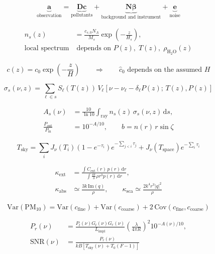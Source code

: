 \documentclass{article}
\begin{document}
\color{eqcolor}\fontsize{24}{32}\selectfont
\[\displaystyle \underbrace{\mathbf a}_{\text{observation}}=\underbrace{\mathbf D\mathbf c}_{\text{pollutants}}+\underbrace{\mathbf N\boldsymbol\beta}_{\text{background and instrument}}+\underbrace{\mathbf e}_{\text{noise}}\]

\newpage
\[\displaystyle \begin{aligned}n_s(z)&=\frac{c_{s,0}N_A}{M_s}\exp\!\left(-\frac{z}{H_s}\right),\\[4pt] \text{local spectrum}&\;\text{depends on }P(z),\;T(z),\;\rho_{\mathrm{H_2O}}(z)\end{aligned}\]

\newpage
\[\displaystyle c(z)=c_0\exp\!\left(-\frac{z}{H}\right)\qquad\Longrightarrow\qquad\widehat c_0\text{ depends on the assumed }H\]

\newpage
\[\displaystyle \sigma_s(\nu,z)=\sum_{\ell\in s}S_\ell\!\left(T(z)\right)\,V_\ell\!\left[\nu-\nu_\ell-\delta_\ell P(z);\,T(z),P(z)\right]\]

\newpage
\[\displaystyle \begin{aligned}A_s(\nu)&=\frac{10}{\ln 10}\int_{\mathrm{ray}}n_s(z)\,\sigma_s(\nu,z)\,\mathrm ds,\\[4pt]\frac{P_{\mathrm{out}}}{P_{\mathrm{in}}}&=10^{-A/10},\qquad b=n(r)\,r\sin\zeta\end{aligned}\]

\newpage
\[\displaystyle T_{\mathrm{sky}}=\sum_i J_\nu(T_i)\left(1-e^{-\tau_i}\right)e^{-\sum_{j<i}\tau_j}+J_\nu(T_{\mathrm{space}})e^{-\sum_i\tau_i}\]

\newpage
\[\displaystyle \begin{aligned}\kappa_{\mathrm{ext}}&=\frac{\int C_{\mathrm{ext}}(r)\,p(r)\,\mathrm dr}{\int \frac{4\pi}{3}\rho r^3p(r)\,\mathrm dr},\\[4pt]\kappa_{\mathrm{abs}}&\simeq\frac{3k\,\mathrm{Im}(q)}{\rho},\qquad\kappa_{\mathrm{sca}}\simeq\frac{2k^4r^3|q|^2}{\rho}\end{aligned}\]

\newpage
\[\displaystyle \mathrm{Var}(\mathrm{PM}_{10})=\mathrm{Var}(c_{\mathrm{fine}})+\mathrm{Var}(c_{\mathrm{coarse}})+2\,\mathrm{Cov}(c_{\mathrm{fine}},c_{\mathrm{coarse}})\]

\newpage
\[\displaystyle \begin{aligned}P_r(\nu)&=\frac{P_t(\nu)G_t(\nu)G_r(\nu)}{L_{\mathrm{impl}}}\left(\frac{\lambda}{4\pi R}\right)^2 10^{-A(\nu)/10},\\[4pt]\mathrm{SNR}(\nu)&=\frac{P_r(\nu)}{kB\left[T_{\mathrm{sky}}(\nu)+T_0(F-1)\right]}\end{aligned}\]
\end{document}

